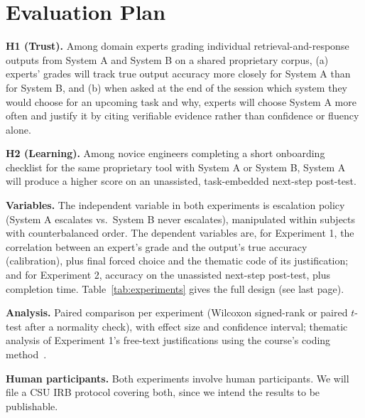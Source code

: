 \documentclass[sigconf,nonacm]{acmart}
\begin{document}
\section{Evaluation Plan}
\label{sec:eval}

\textbf{H1 (Trust).} Among domain experts grading individual
retrieval-and-response outputs from System A and System B on a shared
proprietary corpus, (a) experts' grades will track true output accuracy
more closely for System A than for System B, and (b) when asked at the end
of the session which system they would choose for an upcoming task and why,
experts will choose System A more often and justify it by citing verifiable
evidence rather than confidence or fluency alone.

\textbf{H2 (Learning).} Among novice engineers completing a short
onboarding checklist for the same proprietary tool with System A or System
B, System A will produce a higher score on an unassisted, task-embedded
next-step post-test.

\textbf{Variables.} The independent variable in both experiments is
escalation policy (System A escalates vs.\ System B never escalates),
manipulated within subjects with counterbalanced order. The dependent
variables are, for Experiment 1, the correlation between an expert's grade
and the output's true accuracy (calibration), plus final forced choice and
the thematic code of its justification; and for Experiment 2, accuracy on
the unassisted next-step post-test, plus completion time.
Table~\ref{tab:experiments} gives the full design (see last page).

\textbf{Analysis.} Paired comparison per experiment (Wilcoxon signed-rank
or paired $t$-test after a normality check), with effect size and
confidence interval; thematic analysis of Experiment 1's free-text
justifications using the course's coding method~\cite{ortega2026slides}.

\textbf{Human participants.} Both experiments involve human participants.
We will file a CSU IRB protocol covering both, since we intend the results
to be publishable.
\end{document}
